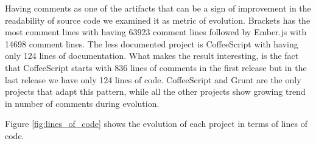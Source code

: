 \par
Having comments as one of the artifacts that can be a sign of improvement in the readability of source code we examined it as metric of evolution.
Brackets has the most comment lines with having 63923 comment lines followed by Ember.js with 14698 comment lines. The less documented project is CoffeeScript with having only 124 lines of documentation. What makes the result interesting, is the fact that CoffeeScript starts with 836 lines of comments in the first release but in the last release we have only 124 lines of code. CoffeeScript and Grunt are the only projects that adapt this pattern, while all the other projects show growing trend in number of comments during evolution.  


Figure \ref{fig:lines_of_code} shows the evolution of each project in terms of lines of code. 

